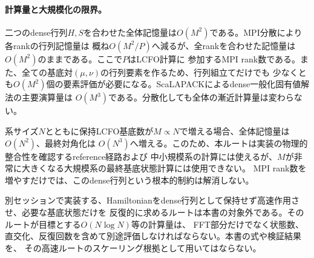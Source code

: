 \documentclass[11pt,a4paper]{article}
\begin{document}
\paragraph{計算量と大規模化の限界。}
二つのdense行列$H,S$を合わせた全体記憶量は$O(M^2)$である。MPI分散により各rankの行列記憶量は
概ね$O(M^2/P)$へ減るが、全rankを合わせた記憶量は$O(M^2)$のままである。ここで$P$はLCFO計算に
参加するMPI rank数である。また、全ての基底対$(\mu,\nu)$の行列要素を作るため、行列組立てだけでも
少なくとも$O(M^2)$個の要素評価が必要になる。ScaLAPACKによるdense一般化固有値解法の主要演算量は
$O(M^3)$である。分散化しても全体の漸近計算量は変わらない。

系サイズ$N$とともに保持LCFO基底数が$M\propto N$で増える場合、全体記憶量は$O(N^2)$、最終対角化は
$O(N^3)$へ増える。このため、本ルートは実装の物理的整合性を確認するreference経路および
中小規模系の計算には使えるが、$M$が非常に大きくなる大規模系の最終基底状態計算には使用できない。
MPI rank数を増やすだけでは、このdense行列という根本的制約は解消しない。

別セッションで実装する、Hamiltonianをdense行列として保持せず高速作用させ、必要な基底状態だけを
反復的に求めるルートは本書の対象外である。そのルートが目標とする$O(N\log N)$等の計算量は、
FFT部分だけでなく状態数、直交化、反復回数を含めて別途評価しなければならない。本書の式や検証結果を、
その高速ルートのスケーリング根拠として用いてはならない。

\tableofcontents
\end{document}
